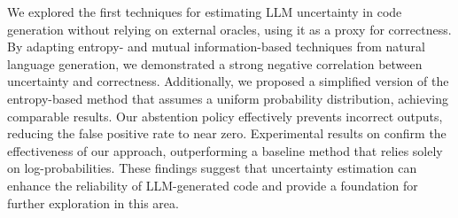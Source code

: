 We explored the first techniques for estimating LLM uncertainty in code generation without relying on external oracles, using it as a proxy for correctness. By adapting entropy- and mutual information-based techniques from natural language generation, we demonstrated a strong negative correlation between uncertainty and correctness. 
Additionally, we proposed a simplified version of the entropy-based method that assumes a uniform probability distribution, achieving comparable results. 
Our abstention policy effectively prevents incorrect outputs, reducing the false positive rate to near zero. 
Experimental results on \livecodebench confirm the effectiveness of our approach, outperforming a baseline method that relies solely on log-probabilities. 
These findings suggest that uncertainty estimation can enhance the reliability of LLM-generated code and provide a foundation for further exploration in this area.

